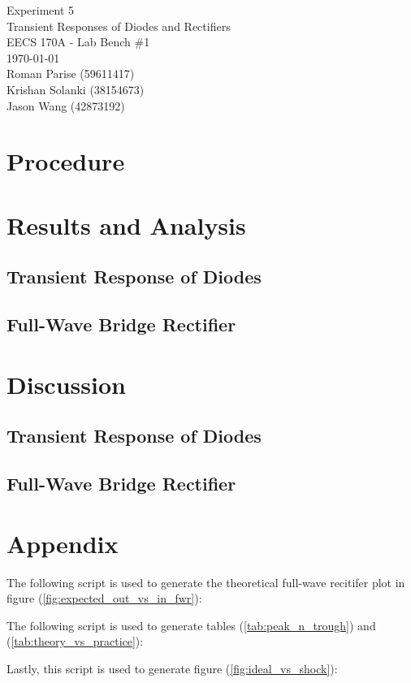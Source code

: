 \documentclass{article}
\begin{document}
	\begin{titlepage}
		\centering
		\Huge{Experiment 5} \\
		\huge{Transient Responses of Diodes and Rectifiers} \\
		\vspace{1cm}
		\large{EECS 170A - Lab Bench \#1} \\
		\large{\today} \\
		\vspace{1cm}
		\normalsize{Roman Parise (59611417)} \\
		\normalsize{Krishan Solanki (38154673)} \\
		\normalsize{Jason Wang (42873192)} \\
	\end{titlepage}
\section{Procedure}

\section{Results and Analysis}
\subsection{Transient Response of Diodes}
\subsection{Full-Wave Bridge Rectifier}

\section{Discussion}
\subsection{Transient Response of Diodes}
\subsection{Full-Wave Bridge Rectifier}

\section{Appendix}
The following script is used to generate the theoretical full-wave recitifer plot in figure (\ref{fig:expected_out_vs_in_fwr}):

The following script is used to generate tables (\ref{tab:peak_n_trough}) and (\ref{tab:theory_vs_practice}):

Lastly, this script is used to generate figure (\ref{fig:ideal_vs_shock}):

\end{document}

